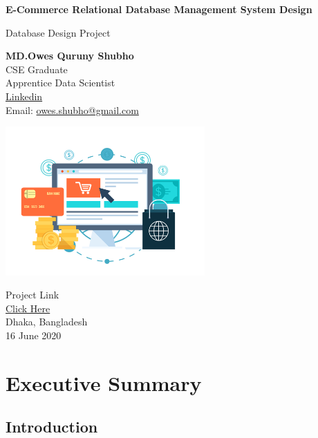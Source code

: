 \documentclass{article}
\begin{document}
\begin{titlepage}
	\begin{center}
		\Huge
		\textbf{E-Commerce Relational Database Management System Design}
		
		\vspace{0.5cm}
		\LARGE
		Database Design Project
		
		\vspace{1.5 cm}
		
		\textbf{MD.Owes Quruny Shubho}\\
		\vspace*{0.1cm}
		CSE Graduate\\
		Apprentice Data Scientist\\
		\href{https://www.linkedin.com/in/shubhobd/}{Linkedin}\\
		Email: \href{mailto:owes.shubho@gmail.com}{owes.shubho@gmail.com} 
		
		
		\vspace{1cm}
		\includegraphics[width=3in]{images/ecommerce_logo.png}
		
		\Large
		Project Link\\
		\href{https://github.com/shubhomedia/Ecommerce_Database_Design/}{Click Here}\\ 
		Dhaka, Bangladesh\\
		16 June 2020\\
		
	\end{center}
\end{titlepage}

	\tableofcontents
	\pagebreak
	\vspace*{2 cm}
	\section{Executive Summary}
	\subsection{Introduction}
\end{document}

